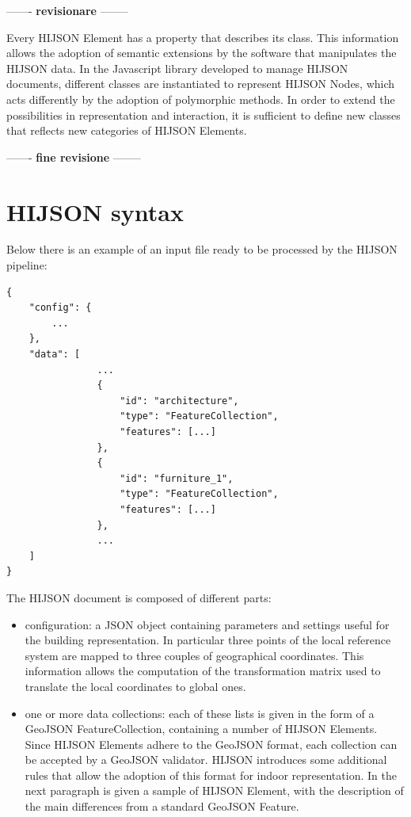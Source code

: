 \documentclass{sig-alternate}
\begin{document}
------- \textbf{revisionare} --------


Every HIJSON Element has a property that describes its class. This
information allows the adoption of semantic extensions by the software
that manipulates the HIJSON data. In the Javascript library developed to
manage HIJSON documents, different classes are instantiated to represent
HIJSON Nodes, which acts differently by the adoption of polymorphic
methods. In order to extend the possibilities in representation and
interaction, it is sufficient to define new classes that reflects new
categories of HIJSON Elements.

------- \textbf{fine revisione} --------

\section{HIJSON syntax}\label{hijson-syntax}

Below there is an example of an input file ready to be processed by the HIJSON pipeline:

\begin{verbatim}
{
    "config": {
        ...
    },
    "data": [
                ...
                {
                    "id": "architecture",
                    "type": "FeatureCollection",
                    "features": [...] 
                },
                {
                    "id": "furniture_1",
                    "type": "FeatureCollection",
                    "features": [...] 
                },
                ...
    ]
}
\end{verbatim}

The HIJSON document is composed of different parts:

\begin{itemize}
\itemsep1pt\parskip0pt
\item
  configuration: a JSON object containing parameters and settings useful
  for the building representation. In particular three points of the
  local reference system are mapped to three couples of geographical
  coordinates. This information allows the computation of the
  transformation matrix used to translate the local coordinates to
  global ones.
\item
  one or more data collections: each of these lists is given in the form
  of a GeoJSON FeatureCollection, containing a number of HIJSON
  Elements. Since HIJSON Elements adhere to the GeoJSON format, each
  collection can be accepted by a GeoJSON validator. HIJSON introduces
  some additional rules that allow the adoption of this format for
  indoor representation. In the next paragraph is given a sample of HIJSON Element, with
  the description of the main differences from a standard GeoJSON
  Feature.
\end{itemize}
\end{document}
